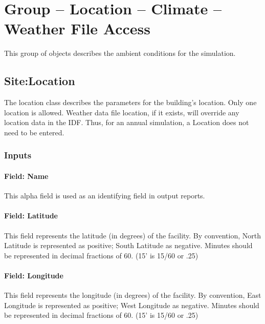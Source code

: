\section{Group -- Location -- Climate -- Weather File Access}\label{group-location-climate-weather-file-access}

This group of objects describes the ambient conditions for the simulation.

\subsection{Site:Location}\label{sitelocation}

The location class describes the parameters for the building's location. Only one location is allowed. Weather data file location, if it exists, will override any location data in the IDF. Thus, for an annual simulation, a Location does not need to be entered.

\subsubsection{Inputs}\label{inputs-201709281625}

\paragraph{Field: Name}\label{field-name-201709281626}

This alpha field is used as an identifying field in output reports.

\paragraph{Field: Latitude}\label{field-latitude}

This field represents the latitude (in degrees) of the facility. By convention, North Latitude is represented as positive; South Latitude as negative. Minutes should be represented in decimal fractions of 60. (15' is 15/60 or .25)

\paragraph{Field: Longitude}\label{field-longitude}

This field represents the longitude (in degrees) of the facility. By convention, East Longitude is represented as positive; West Longitude as negative. Minutes should be represented in decimal fractions of 60. (15' is 15/60 or .25)

